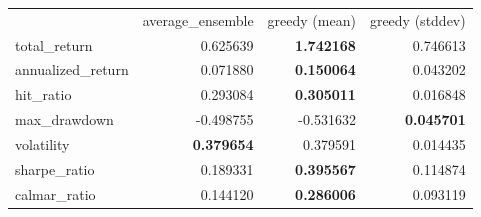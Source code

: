 \begin{tabular}{lrrr}
 & average_ensemble & greedy (mean) & greedy (stddev) \\
total_return & 0.625639 & \bfseries 1.742168 & 0.746613 \\
annualized_return & 0.071880 & \bfseries 0.150064 & 0.043202 \\
hit_ratio & 0.293084 & \bfseries 0.305011 & 0.016848 \\
max_drawdown & -0.498755 & -0.531632 & \bfseries 0.045701 \\
volatility & \bfseries 0.379654 & 0.379591 & 0.014435 \\
sharpe_ratio & 0.189331 & \bfseries 0.395567 & 0.114874 \\
calmar_ratio & 0.144120 & \bfseries 0.286006 & 0.093119 \\
\end{tabular}
